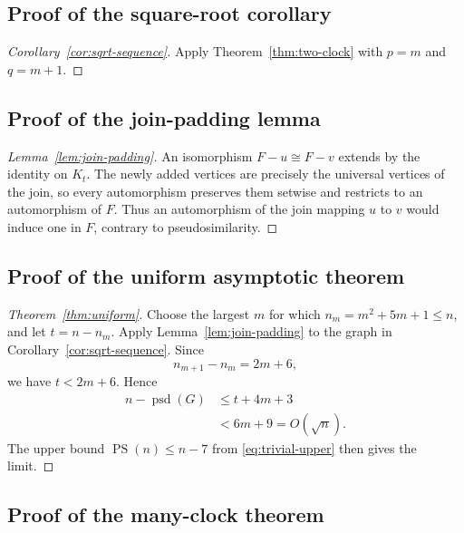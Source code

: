 \documentclass[11pt]{article}
\theoremstyle{definition}
\theoremstyle{remark}
\newcommand{\psd}{\operatorname{psd}}
\newcommand{\PS}{\operatorname{PS}}
\begin{document}
\subsection{Proof of the square-root corollary}\label{app:sqrt-sequence}

\begin{proof}[Corollary~\ref{cor:sqrt-sequence}]
Apply Theorem~\ref{thm:two-clock} with $p=m$ and $q=m+1$.
\end{proof}

\subsection{Proof of the join-padding lemma}\label{app:join-padding}

\begin{proof}[Lemma~\ref{lem:join-padding}]
An isomorphism $F-u\cong F-v$ extends by the identity on $K_t$. The newly added vertices are precisely the universal vertices of the join, so every automorphism preserves them setwise and restricts to an automorphism of $F$. Thus an automorphism of the join mapping $u$ to $v$ would induce one in $F$, contrary to pseudosimilarity.
\end{proof}

\subsection{Proof of the uniform asymptotic theorem}\label{app:uniform}

\begin{proof}[Theorem~\ref{thm:uniform}]
Choose the largest $m$ for which $n_m=m^2+5m+1\le n$, and let $t=n-n_m$. Apply Lemma~\ref{lem:join-padding} to the graph in Corollary~\ref{cor:sqrt-sequence}. Since
\[
    n_{m+1}-n_m=2m+6,
\]
we have $t<2m+6$. Hence
\[
\begin{aligned}
    n-\psd(G)
    &\le t+4m+3\\
    &<6m+9
     =O(\sqrt n).
\end{aligned}
\]
The upper bound $\PS(n)\le n-7$ from \eqref{eq:trivial-upper} then gives the limit.
\end{proof}

\subsection{Proof of the many-clock theorem}\label{app:many-clock}
\end{document}
